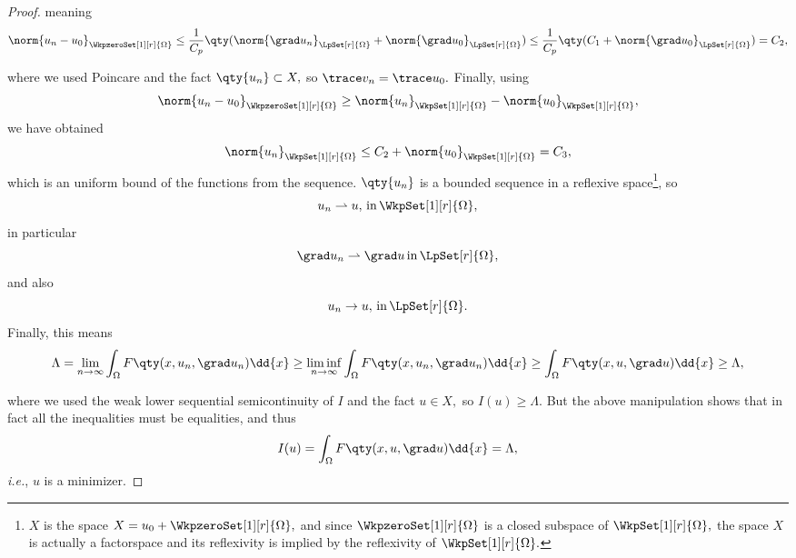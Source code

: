 \begin{proof}
meaning
\[
	\norm{u_n-u_0}_{\WkpzeroSet[1][r]{\Omega}} \leq \frac{1}{C_p}\qty(\norm{\grad u_n}_{\LpSet[r]{\Omega}}+ \norm{\grad u_0}_{\LpSet[r]{\Omega}}) \leq \frac{1}{C_p}\qty(C_1 + \norm{\grad u_0}_{\LpSet[r]{\Omega}}) = C_2,
\]

where we used Poincare and the fact $\qty{u_n} \subset X,$ so $\trace v_n = \trace u_0.$ Finally, using
\[
	\norm{u_n - u_0}_{\WkpzeroSet[1][r]{\Omega}} \geq \norm{u_n}_{\WkpSet[1][r]{\Omega}} - \norm{u_0}_{\WkpSet[1][r]{\Omega}},
\]
we have obtained
\[
	\norm{u_n}_{\WkpSet[1][r]{\Omega}} \leq C_2 + \norm{u_0}_{\WkpSet[1][r]{\Omega}} = C_3,
\]
which is an uniform bound of the functions from the sequence.  $\qty{u_n}$ is a bounded sequence in a reflexive space\footnote{$X$ is the space $X = u_0 + \WkpzeroSet[1][r]{\Omega},$ and since $\WkpzeroSet[1][r]{\Omega}$ is a closed subspace of $\WkpSet[1][r]{\Omega},$ the space $X$ is actually a factorspace and its reflexivity is implied by the reflexivity of $\WkpSet[1][r]{\Omega}.$}, so
    \[
	    u_n \rightharpoonup u, \, \text{in} \, \WkpSet[1][r]{\Omega},
    \]
    in particular
    \[
	    \grad u_n \rightharpoonup \grad u \, \text{in} \, \LpSet[r]{\Omega},
    \]
    and also
    \[
	    u_n \to u, \, \text{in} \, \LpSet[r]{\Omega}.
    \]
Finally, this means
\[
	\Lambda = \lim_{n \to \infty} \int_{\Omega}F\qty(x, u_n, \grad u_n)\dd{x} \geq \liminf_{n \to \infty} \int_{\Omega}F\qty(x, u_n, \grad u_n)\dd{x} \geq \int_{\Omega}F\qty(x, u, \grad u)\dd{x} \geq \Lambda,
\]

where we used the weak lower sequential semicontinuity of $I$ and the fact $u \in X,$ so $I(u) \geq \Lambda.$ But the above manipulation shows that in fact all the inequalities must be equalities, and thus
\[
	I(u) = \int_{\Omega}F\qty(x, u, \grad u)\dd{x} = \Lambda,
\]
\textit{i.e.}, $u$ is a minimizer.
\end{proof}

